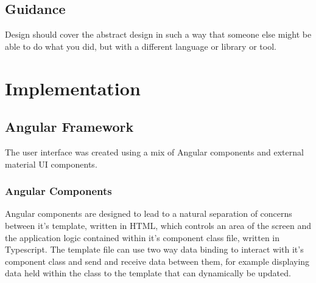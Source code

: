 \documentclass{l4proj}
\begin{document}
\section{Guidance}
Design should cover the abstract design in such a way that someone else might be able to do what you did, but with a different language or library or tool.

\chapter{Implementation}

\section{Angular Framework}
The user interface was created using a mix of Angular components and external material UI components.
\subsection{Angular Components}
Angular components are designed to lead to a natural separation of concerns between it's template, written in HTML, which controls an area of the screen and the application logic contained within it's component class file, written in Typescript. The template file can use two way data binding to interact with it's component class and send and receive data between them, for example displaying data held within the class to the template that can dynamically be updated.
\end{document}
